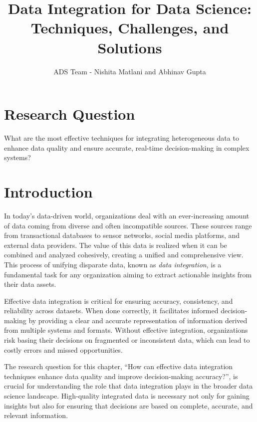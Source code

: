 \documentclass[12pt]{article}
\begin{document}
\title{Data Integration for Data Science: Techniques, Challenges, and Solutions}
\author{ADS Team - Nishita Matlani and Abhinav Gupta}
\date{}
\maketitle

\newpage

\tableofcontents

\newpage

\section{Research Question}
What are the most effective techniques for integrating heterogeneous data to enhance data quality and ensure accurate, real-time decision-making in complex systems?

\section{Introduction}
In today’s data-driven world, organizations deal with an ever-increasing amount of data coming from diverse and often incompatible sources. These sources range from transactional databases to sensor networks, social media platforms, and external data providers. The value of this data is realized when it can be combined and analyzed cohesively, creating a unified and comprehensive view. This process of unifying disparate data, known as \textit{data integration}, is a fundamental task for any organization aiming to extract actionable insights from their data assets.

Effective data integration is critical for ensuring accuracy, consistency, and reliability across datasets. When done correctly, it facilitates informed decision-making by providing a clear and accurate representation of information derived from multiple systems and formats. Without effective integration, organizations risk basing their decisions on fragmented or inconsistent data, which can lead to costly errors and missed opportunities.

The research question for this chapter, “How can effective data integration techniques enhance data quality and improve decision-making accuracy?”, is crucial for understanding the role that data integration plays in the broader data science landscape. High-quality integrated data is necessary not only for gaining insights but also for ensuring that decisions are based on complete, accurate, and relevant information.
\end{document}
